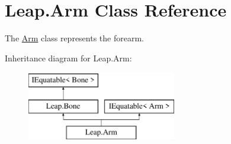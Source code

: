 \hypertarget{class_leap_1_1_arm}{}\section{Leap.\+Arm Class Reference}
\label{class_leap_1_1_arm}


The \mbox{\hyperlink{class_leap_1_1_arm}{Arm}} class represents the forearm.  


Inheritance diagram for Leap.\+Arm\+:\begin{figure}[H]
\begin{center}
\leavevmode
\includegraphics[height=3.000000cm]{class_leap_1_1_arm}
\end{center}
\end{figure}
